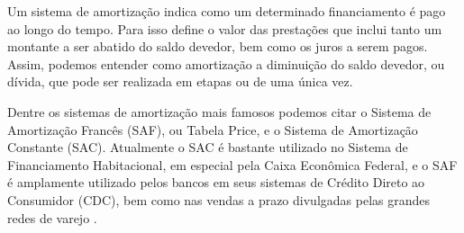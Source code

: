 Um sistema de amortização indica como um determinado financiamento é pago ao longo do tempo. Para isso define o valor das prestações que inclui tanto um montante a ser abatido do saldo devedor, bem como os juros a serem pagos. Assim, podemos entender como amortização a diminuição do saldo devedor, ou dívida, que pode ser realizada em etapas ou de uma única vez.

Dentre os sistemas de amortização mais famosos podemos citar o Sistema de Amortização Francês (SAF), ou Tabela Price, e o Sistema de Amortização Constante (SAC). Atualmente o SAC é bastante utilizado no Sistema de Financiamento Habitacional, em especial pela Caixa Econômica Federal, e o SAF é amplamente utilizado pelos bancos em seus sistemas de Crédito Direto ao Consumidor (CDC), bem como nas vendas a prazo divulgadas pelas grandes redes de varejo \cite{usoSACSAF}.

